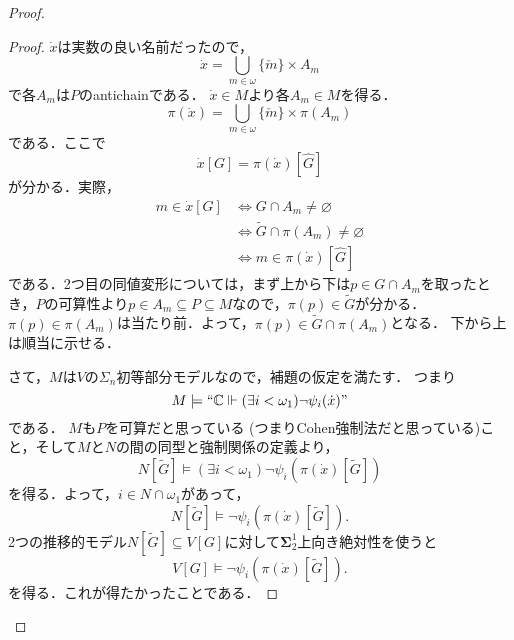 \documentclass[uplatex]{jsarticle}
\newcommand{\C}{\mathbb{C}}
\newcommand{\boldsig}{\boldsymbol{\Sigma}}
\newcommand\forces{\Vdash}
\renewcommand\emptyset{\varnothing}
\renewcommand\subset{\subseteq}
\theoremstyle{definition}
\begin{document}
\begin{proof}
\begin{proof}
			$\dot{x}$は実数の良い名前だったので，
			\[
			\dot{x} = \bigcup_{m \in \omega} \{\check{m}\} \times A_m
			\]
			で各$A_m$は$P$のantichainである．
			$\dot{x} \in M$より各$A_m \in M$を得る．
			\[
				\pi(\dot{x}) = \bigcup_{m \in \omega} \{\check{m}\} \times \pi(A_m)
			\]
			である．ここで
			\[
			\dot{x}[G] = \pi(\dot{x})[\hat{G}]
			\]
			が分かる．実際，
			\begin{align*}
			m \in \dot{x}[G] &\iff G \cap A_m \ne \emptyset \\
			&\iff \tilde{G} \cap \pi(A_m) \ne \emptyset \\
			&\iff m \in \pi(\dot{x})[\hat{G}]
			\end{align*}
			である．2つ目の同値変形については，まず上から下は$p \in G \cap A_m$を取ったとき，$P$の可算性より$p \in A_m \subset P \subset M$なので，$\pi(p) \in \tilde{G}$が分かる．$\pi(p) \in \pi(A_m)$は当たり前．よって，$\pi(p) \in \tilde{G} \cap \pi(A_m)$となる．
			下から上は順当に示せる．
			
			さて，$M$は$V$の$\Sigma_n$初等部分モデルなので，補題の仮定を満たす．
			つまり\[M \models ``\C \forces (\exists i < \omega_1)\neg \psi_i(\dot{x})"\]である．
			$M$も$P$を可算だと思っている (つまりCohen強制法だと思っている)こと，そして$M$と$N$の間の同型と強制関係の定義より，
			\[
			N[\tilde{G}] \models (\exists i < \omega_1)\neg \psi_i(\pi(\dot{x})[\tilde{G}])
			\]
			を得る．よって，$i \in N \cap \omega_1$があって，
			\[
			N[\tilde{G}] \models \neg \psi_i(\pi(\dot{x})[\tilde{G}]).
			\]
			2つの推移的モデル$N[\tilde{G}] \subset V[G]$に対して$\boldsig^1_2$上向き絶対性を使うと
			\[
			V[G] \models \neg \psi_i(\pi(\dot{x})[\tilde{G}]).
			\]
			を得る．これが得たかったことである．
		\end{proof}
		
		\renewcommand\qedsymbol{$\square$}
		
	\end{proof}

	
	
	\nocite{*}
	\printbibliography[title={参考文献}]
	
\end{document}
